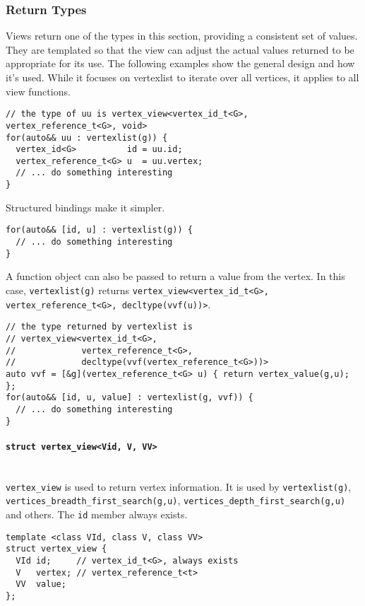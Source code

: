 \documentclass[10pt,onecolumn]{article}
\newcommand{\tcode}[1]{\lstinline[breaklines=true]{#1}}
\begin{document}
\subsubsection{Return Types}
Views return one of the types in this section, providing a consistent set of values. They are templated so that the view can adjust the actual values returned to be appropriate for its use. The following examples show the general design and how it's used. While it focuses on vertexlist to iterate over all vertices, it applies to all view functions.

\begin{lstlisting}
// the type of uu is vertex_view<vertex_id_t<G>, vertex_reference_t<G>, void>
for(auto&& uu : vertexlist(g)) {
  vertex_id<G>          id = uu.id;
  vertex_reference_t<G> u  = uu.vertex;
  // ... do something interesting
}
\end{lstlisting}

Structured bindings make it simpler.
\begin{lstlisting}
for(auto&& [id, u] : vertexlist(g)) {
  // ... do something interesting
}
\end{lstlisting}

A function object can also be passed to return a value from the vertex. In this case, \tcode{vertexlist(g)} returns \tcode{vertex_view<vertex_id_t<G>, vertex_reference_t<G>, decltype(vvf(u))>}.
\begin{lstlisting}
// the type returned by vertexlist is 
// vertex_view<vertex_id_t<G>, 
//             vertex_reference_t<G>, 
//             decltype(vvf(vertex_reference_t<G>))>
auto vvf = [&g](vertex_reference_t<G> u) { return vertex_value(g,u); };
for(auto&& [id, u, value] : vertexlist(g, vvf)) {
  // ... do something interesting
}
\end{lstlisting}

\paragraph{\tcode{struct vertex_view<Vid, V, VV>}}\label{vertex-view}\mbox{} \\
\tcode{vertex_view} is used to return vertex information. It is used by \tcode{vertexlist(g)}, \tcode{vertices_breadth_first_search(g,u)}, \tcode{vertices_depth_first_search(g,u)} and others. The \tcode{id} member always exists.

\begin{lstlisting}
template <class VId, class V, class VV>
struct vertex_view {
  VId id;     // vertex_id_t<G>, always exists
  V   vertex; // vertex_reference_t<t>
  VV  value;
};
\end{lstlisting}
\end{document}
